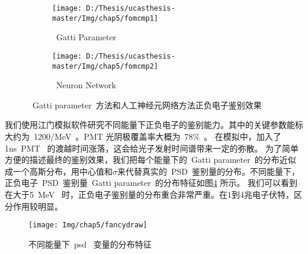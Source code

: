 \begin{figure}[!htbp]
  \centering
  \begin{subfigure}[b]{\MySubFactor\textwidth}
    \texttt{[image: D:/Thesis/ucasthesis-master/Img/chap5/fomcmp1]}
    \caption{~Gatti Parameter~}
    \label{fig:p58_1}
  \end{subfigure}%
  \quad\quad\quad\quad\quad\quad%
  \begin{subfigure}[b]{\MySubFactor\textwidth}
    \texttt{[image: D:/Thesis/ucasthesis-master/Img/chap5/fomcmp2]}
    \caption{~Neuron Network~}
    \label{fig:p58_2}
  \end{subfigure}
  \quad\quad
    \caption{~Gatti parameter~方法和人工神经元网络方法正负电子鉴别效果}
  \label{fig:p58}
\end{figure}
我们使用江门模拟软件研究不同能量下正负电子的鉴别能力。其中的关键参数能标大约为~1200/MeV~。PMT 光阴极覆盖率大概为~78\%~。 在模拟中，加入了1ns~PMT~ 的渡越时间涨落，这会给光子发射时间谱带来一定的弥散。 为了简单方便的描述最终的鉴别效果，我们把每个能量下的~Gatti parameter~的分布近似成一个高斯分布，用中心值和$\sigma$来代替真实的~PSD~鉴别量的分布。不同能量下，正负电子~PSD~鉴别量~Gatti parameter~的分布特征如图\ref{fig:p510} 所示。%
我们可以看到在大于5~MeV~ 时，正负电子鉴别量的分布重合非常严重。在1到4兆电子伏特，区分作用较明显。
\begin{figure}[!htb]
  \centering
   \texttt{[image: Img/chap5/fancydraw]}
    \caption{不同能量下~psd~ 变量的分布特征}
  \label{fig:p510}
\end{figure}
%
